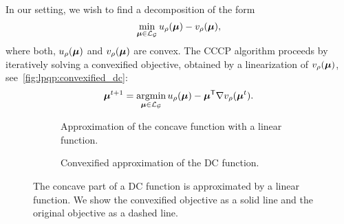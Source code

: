 In our setting, we wish to find a decomposition of the form 
\[
    \min_{\bm{\mu}\in\mathcal{L}_{\mathcal{G}}} u_{\rho}(\bm{\mu})
    - v_{\rho}(\bm{\mu}),
\]
where both, $u_{\rho}(\bm{\mu})$ and $v_{\rho}(\bm{\mu})$ are convex.
The \ac{CCCP} algorithm proceeds by iteratively solving a convexified
objective, obtained by a linearization of $v_{\rho}(\bm{\mu})$,
see~\autoref{fig:lpqp:convexified_dc}:
\begin{equation}
\label{eq:lpqp:dca}
    \marginalvarv^{t+1} = \argmin_{\marginalvarv \in
    \localmarginalpolytope_{\gmgraph}} u_{\rho}(\marginalvarv) -
    \marginalvarv^{\transpose} \nabla v_{\rho}(\marginalvarv^{t}).
\end{equation}

\begin{figure}[htb]
    \centering
    \begin{subfigure}[T]{0.45\textwidth}
        \caption{Approximation of the concave function with a linear function.}
    \end{subfigure}
    \begin{subfigure}[T]{0.45\textwidth}
        \caption{Convexified approximation of the \ac{DC} function.}
    \end{subfigure}
    \caption[CCCP visualization]{The concave part of a \ac{DC} function is
    approximated by a linear function. We show the convexified objective as a
    solid line and the original objective as a dashed line.}
    \label{fig:lpqp:convexified_dc}
\end{figure}
